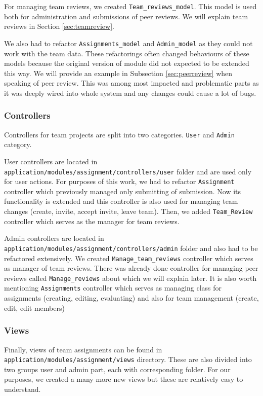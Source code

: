 For managing team reviews, we created \texttt{Team\_reviews\_model}. This model is used both for administration and submissions of peer reviews. We will explain team reviews in Section \ref{sec:teamreview}.

We also had to refactor \texttt{Assignments\_model} and \texttt{Admin\_model} as they could not work with the team data. These refactorings often changed behaviours of these models because the original version of module did not expected to be extended this way. We will provide an example in Subsection \ref{sec:peerreview} when speaking of peer review. This was among most impacted and problematic parts as it was deeply wired into whole system and any changes could cause a lot of bugs.

\subsubsection{Controllers}
Controllers for team projects are split into two categories. \texttt{User} and \texttt{Admin} category.

User controllers are located in \\ \texttt{application/modules/assignment/controllers/user} folder and are used only for user actions. For purposes of this work, we had to refactor \texttt{Assignment} controller which previously managed only submitting of submission. Now its functionality is extended and this controller is also used for managing team changes (create, invite, accept invite, leave team). Then, we added \texttt{Team\_Review} controller which serves as the manager for team reviews.

Admin controllers are located in \\ \texttt{application/modules/assignment/controllers/admin} folder and also had to be refactored extensively. We created \texttt{Manage\_team\_reviews} controller which serves as manager of team reviews. There was already done controller for managing peer reviews called \texttt{Manage\_reviews} about which we will explain later. It is also worth mentioning \texttt{Assignments} controller which serves as managing class for assignments (creating, editing, evaluating) and also for team management (create, edit, edit members)

\subsubsection{Views}
Finally, views of team assignments can be found in \\ \texttt{application/modules/assignment/views} directory. These are also divided into two groups user and admin part, each with corresponding folder. For our purposes, we created a many more new views but these are relatively easy to understand.

